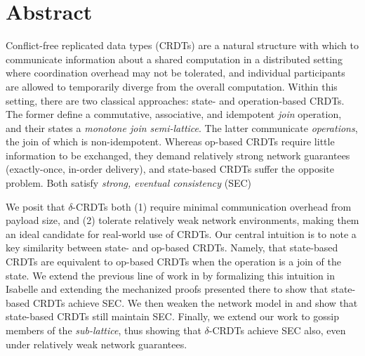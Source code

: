 \chapter{Abstract}

Conflict-free replicated data types (CRDTs) are a natural structure with which
to communicate information about a shared computation in a distributed setting
where coordination overhead may not be tolerated, and individual participants
are allowed to temporarily diverge from the overall computation.  Within this
setting, there are two classical approaches: state- and operation-based CRDTs.
The former define a commutative, associative, and idempotent \textit{join}
operation, and their states a \textit{monotone join semi-lattice}. The latter
communicate \textit{operations}, the join of which is non-idempotent. Whereas
op-based CRDTs require little information to be exchanged, they demand
relatively strong network guarantees (exactly-once, in-order delivery), and
state-based CRDTs suffer the opposite problem. Both satisfy \textit{strong,
eventual consistency} (SEC)

We posit that $\delta$-CRDTs both (1) require minimal communication overhead
from payload size, and (2) tolerate relatively weak network environments, making
them an ideal candidate for real-world use of CRDTs. Our central intuition is to
note a key similarity between state- and op-based CRDTs. Namely, that
state-based CRDTs are equivalent to op-based CRDTs when the operation is a join
of the state. We extend the previous line of work in \cite{gomes17} by
formalizing this intuition in Isabelle and extending the mechanized proofs
presented there to show that state-based CRDTs achieve SEC. We then weaken the
network model in \cite{gomes17} and show that state-based CRDTs still maintain
SEC. Finally, we extend our work to gossip members of the \textit{sub-lattice},
thus showing that $\delta$-CRDTs achieve SEC also, even under relatively weak
network guarantees.

